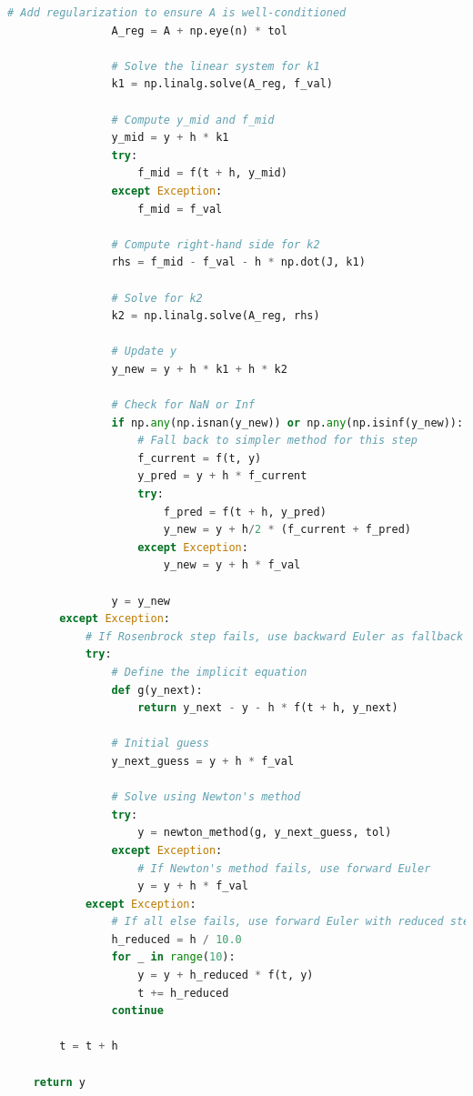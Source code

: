 \documentclass[11pt,a4paper]{article}
\begin{document}
\begin{lstlisting}[language=Python, caption=Improved Rosenbrock Method Implementation]
                # Add regularization to ensure A is well-conditioned
                A_reg = A + np.eye(n) * tol
                
                # Solve the linear system for k1
                k1 = np.linalg.solve(A_reg, f_val)
                
                # Compute y_mid and f_mid
                y_mid = y + h * k1
                try:
                    f_mid = f(t + h, y_mid)
                except Exception:
                    f_mid = f_val
                
                # Compute right-hand side for k2
                rhs = f_mid - f_val - h * np.dot(J, k1)
                
                # Solve for k2
                k2 = np.linalg.solve(A_reg, rhs)
                
                # Update y
                y_new = y + h * k1 + h * k2
                
                # Check for NaN or Inf
                if np.any(np.isnan(y_new)) or np.any(np.isinf(y_new)):
                    # Fall back to simpler method for this step
                    f_current = f(t, y)
                    y_pred = y + h * f_current
                    try:
                        f_pred = f(t + h, y_pred)
                        y_new = y + h/2 * (f_current + f_pred)
                    except Exception:
                        y_new = y + h * f_val
                
                y = y_new
        except Exception:
            # If Rosenbrock step fails, use backward Euler as fallback
            try:
                # Define the implicit equation
                def g(y_next):
                    return y_next - y - h * f(t + h, y_next)
                
                # Initial guess
                y_next_guess = y + h * f_val
                
                # Solve using Newton's method
                try:
                    y = newton_method(g, y_next_guess, tol)
                except Exception:
                    # If Newton's method fails, use forward Euler
                    y = y + h * f_val
            except Exception:
                # If all else fails, use forward Euler with reduced step size
                h_reduced = h / 10.0
                for _ in range(10):
                    y = y + h_reduced * f(t, y)
                    t += h_reduced
                continue
        
        t = t + h
    
    return y
\end{lstlisting}
\end{document}
